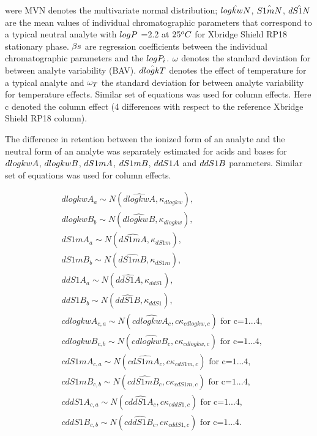 \documentclass[
]{article}
\begin{document}
were MVN denotes the multivariate normal distribution;
\(\small \hat{logkwN}\), \(\small \hat{S1mN}\), \(\small \hat{dS1N}\)
are the mean values of individual chromatographic parameters that
correspond to a typical neutral analyte with \(\small logP\) =2.2 at
\(\small 25^oC\) for Xbridge Shield RP18 stationary phase.
\(\small \beta s\) are regression coefficients between the individual
chromatographic parameters and the \(\small logP_i\). \(\small \omega\)
denotes the standard deviation for between analyte variability (BAV).
\(\small \hat{dlogkT}\) denotes the effect of temperature for a typical
analyte and \(\small \omega_T\) the standard deviation for between
analyte variability for temperature effects. Similar set of equations
was used for column effects. Here c denoted the column effect (4
differences with respect to the reference Xbridge Shield RP18 column).

The difference in retention between the ionized form of an analyte and
the neutral form of an analyte was separately estimated for acids and
bases for \(\small dlogkwA\), \(\small dlogkwB\), \(\small dS1mA\),
\(\small dS1mB\), \(\small ddS1A\) and \(\small ddS1B\) parameters.
Similar set of equations was used for column effects.

\[
\begin{aligned}
& dlogkwA_a \sim N(\hat{dlogkwA}, \kappa_{dlogkw}), \\
& dlogkwB_b \sim N(\hat{dlogkwB}, \kappa_{dlogkw}), \\
& dS1mA_a \sim N(\hat{dS1mA}, \kappa_{dS1m}), \\
& dS1mB_b \sim N(\hat{dS1mB}, \kappa_{dS1m}), \\
& ddS1A_a \sim N(\hat{ddS1A}, \kappa_{ddS1}), \\
& ddS1B_b \sim N(\hat{ddS1B}, \kappa_{ddS1}), \\
& cdlogkwA_{c,a} \sim N(\hat{cdlogkwA_{c}}, c\kappa_{cdlogkw,c}) \text{ for c=1...4}, \\
& cdlogkwB_{c,b} \sim N(\hat{cdlogkwB_{c}}, c\kappa_{cdlogkw,c}) \text{ for c=1...4}, \\
& cdS1mA_{c,a} \sim N(\hat{cdS1mA_{c}}, c\kappa_{cdS1m,c}) \text{ for c=1...4}, \\
& cdS1mB_{c,b} \sim N(\hat{cdS1mB_{c}}, c\kappa_{cdS1m,c}) \text{ for c=1...4}, \\
& cddS1A_{c,a} \sim N(\hat{cddS1A_{c}}, c\kappa_{cddS1,c}) \text{ for c=1...4}, \\
& cddS1B_{c,b} \sim N(\hat{cddS1B_{c}}, c\kappa_{cddS1,c}) \text{ for c=1...4}. \\
\end{aligned}
\]
\end{document}
